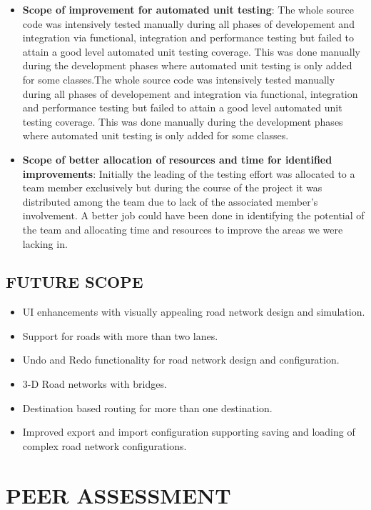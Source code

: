 \documentclass[11pt,a4paper]{article}
\begin{document}
	\begin{itemize}
		\item \textbf{Scope of improvement for automated unit testing}: The whole source code was intensively tested manually during all phases of developement and integration via functional, integration and performance testing but failed to attain a good level automated unit testing coverage. This was done manually during the development phases where automated unit testing is only added for some classes.The whole source code was intensively tested manually during all phases of developement and integration via functional, integration and performance testing but failed to attain a good level automated unit testing coverage. This was done manually during the development phases where automated unit testing is only added for some classes.
		\item \textbf{Scope of better allocation of resources and time for identified improvements}: Initially the leading of the testing effort was allocated to a team member exclusively but during the course of the project it was distributed among the team due to lack of the associated member's involvement. A better job could have been done in identifying the potential of the team and allocating time and resources to improve the areas we were lacking in.
	\end{itemize}

	
	\subsection{FUTURE SCOPE}
		\begin{itemize}
		\setlength\itemsep{0.2em}
			\item UI enhancements with visually appealing road network design and simulation.
			\item Support for roads with more than two lanes.			\item Undo and Redo functionality for road network design and configuration.
			\item 3-D Road networks with bridges.
			\item Destination based routing for more than one destination.
			\item Improved export and import configuration supporting saving and loading of complex road network configurations.
		\end{itemize}

\section{PEER ASSESSMENT}
\end{document}
